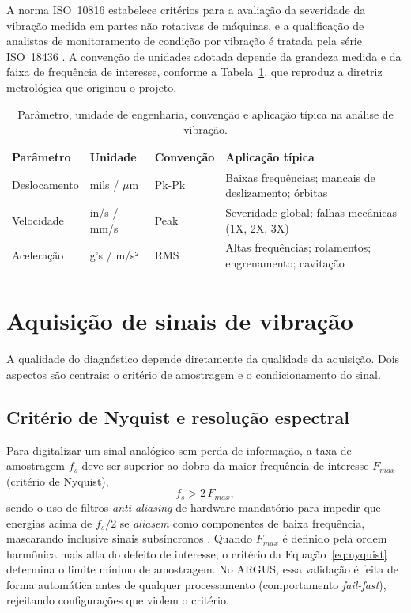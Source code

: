 A norma ISO~10816 estabelece critérios para a avaliação da severidade da
vibração medida em partes não rotativas de máquinas, e a qualificação de
analistas de monitoramento de condição por vibração é tratada pela série
ISO~18436 \cite{iso10816,iso18436}. A convenção de unidades adotada depende da
grandeza medida e da faixa de frequência de interesse, conforme a
Tabela~\ref{tab:unidades}, que reproduz a diretriz metrológica que originou o
projeto.

\begin{table}[htbp]
\centering
\caption{Parâmetro, unidade de engenharia, convenção e aplicação típica na análise de vibração.}
\label{tab:unidades}
\begin{tabular}{@{}llll@{}}
\toprule
\textbf{Parâmetro} & \textbf{Unidade} & \textbf{Convenção} & \textbf{Aplicação típica} \\
\midrule
Deslocamento & mils / $\mu$m & Pk-Pk  & Baixas frequências; mancais de deslizamento; órbitas \\
Velocidade   & in/s / mm/s  & Peak   & Severidade global; falhas mecânicas (1X, 2X, 3X) \\
Aceleração   & g's / m/s²   & RMS    & Altas frequências; rolamentos; engrenamento; cavitação \\
\bottomrule
\end{tabular}
\par\vspace{2pt}{\footnotesize Fonte: diretrizes técnicas do projeto (docs/descricao.txt).}
\end{table}

\section{Aquisição de sinais de vibração}

A qualidade do diagnóstico depende diretamente da qualidade da aquisição. Dois
aspectos são centrais: o critério de amostragem e o condicionamento do sinal.

\subsection{Critério de Nyquist e resolução espectral}

Para digitalizar um sinal analógico sem perda de informação, a taxa de
amostragem \(f_s\) deve ser superior ao dobro da maior frequência de interesse
\(F_{max}\) (critério de Nyquist),
\begin{equation}
\label{eq:nyquist}
  f_s > 2\, F_{max},
\end{equation}
sendo o uso de filtros \emph{anti-aliasing} de hardware mandatório para impedir
que energias acima de \(f_s/2\) se \emph{aliasem} como componentes de baixa
frequência, mascarando inclusive sinais subsíncronos \cite{oppenheim2010}.
Quando \(F_{max}\) é definido pela ordem harmônica mais alta do defeito de
interesse, o critério da Equação~\eqref{eq:nyquist} determina o limite mínimo
de amostragem. No ARGUS, essa validação é feita de forma automática antes de
qualquer processamento (comportamento \emph{fail-fast}), rejeitando
configurações que violem o critério.

